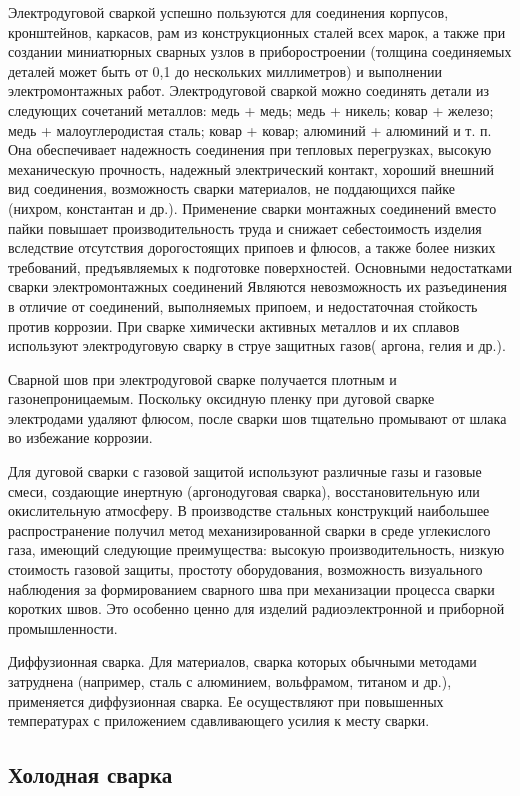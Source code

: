 \documentclass[unicode, 12pt, a4paper, oneside]{article}
\begin{document}
Электродуговой сваркой успешно пользуются для соединения корпусов, кронштейнов, каркасов, рам из конструкционных сталей всех марок, а также при создании миниатюрных сварных узлов в приборостроении (толщина соединяемых деталей может быть от 0,1 до нескольких миллиметров) и выполнении электромонтажных работ. Электродуговой сваркой можно соединять детали из следующих сочетаний металлов: медь + медь;    медь + никель; ковар + железо; медь + малоуглеродистая  сталь; ковар + ковар;   алюминий + алюминий и т. п. Она обеспечивает надежность соединения при тепловых перегрузках, высокую механическую прочность, надежный электрический контакт, хороший внешний вид соединения, возможность сварки материалов, не поддающихся пайке (нихром, константан и др.). Применение сварки монтажных соединений вместо пайки повышает производительность труда и снижает себестоимость изделия вследствие отсутствия дорогостоящих припоев и флюсов, а также более низких требований, предъявляемых к подготовке поверхностей. Основными недостатками сварки электромонтажных соединений Являются невозможность их разъединения в отличие от соединений, выполняемых припоем, и недостаточная стойкость против коррозии. При сварке химически активных металлов и их сплавов используют электродуговую сварку в струе защитных газов( аргона, гелия и др.).

Сварной шов при электродуговой сварке получается плотным и газонепроницаемым. Поскольку оксидную пленку при дуговой сварке электродами удаляют флюсом, после сварки шов тщательно промывают от шлака во избежание коррозии.

Для дуговой сварки с газовой защитой используют различные газы и газовые смеси, создающие инертную (аргонодуговая сварка), восстановительную или окислительную атмосферу. В производстве стальных конструкций наибольшее распространение получил метод механизированной сварки в среде углекислого газа, имеющий следующие преимущества: высокую производительность, низкую стоимость газовой защиты, простоту оборудования, возможность визуального наблюдения за формированием сварного шва при механизации процесса сварки коротких швов. Это особенно ценно для изделий радиоэлектронной и приборной промышленности.

Диффузионная сварка. Для материалов, сварка которых обычными методами затруднена (например, сталь с алюминием, вольфрамом, титаном и др.), применяется диффузионная сварка. Ее осуществляют при повышенных температурах с приложением сдавливающего усилия к месту сварки.

\subsection*{Холодная сварка}
\end{document}
